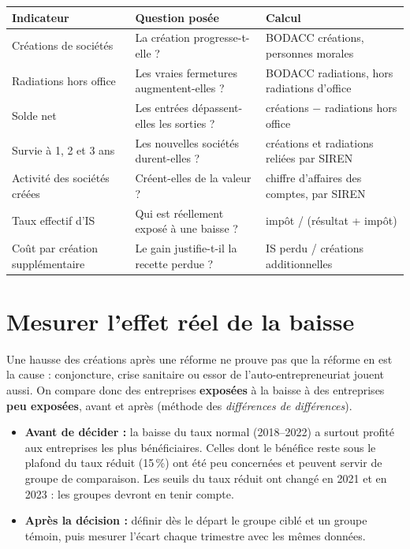 \documentclass[11pt,a4paper]{article}
\begin{document}
\begin{tabularx}{\textwidth}{@{}P{4.4cm}LP{5.4cm}@{}}
\toprule
\textbf{Indicateur} & \textbf{Question posée} & \textbf{Calcul} \\
\midrule
Créations de sociétés & La création progresse-t-elle ? & BODACC créations, personnes morales \\
Radiations hors office & Les vraies fermetures augmentent-elles ? & BODACC radiations, hors radiations d'office \\
Solde net & Les entrées dépassent-elles les sorties ? & créations $-$ radiations hors office \\
Survie à 1, 2 et 3 ans & Les nouvelles sociétés durent-elles ? & créations et radiations reliées par SIREN \\
Activité des sociétés créées & Créent-elles de la valeur ? & chiffre d'affaires des comptes, par SIREN \\
Taux effectif d'IS & Qui est réellement exposé à une baisse ? & impôt / (résultat + impôt) \\
Coût par création supplémentaire & Le gain justifie-t-il la recette perdue ? & IS perdu / créations additionnelles \\
\bottomrule
\end{tabularx}

\section{Mesurer l'effet réel de la baisse}

Une hausse des créations après une réforme ne prouve pas que la réforme en est la cause : conjoncture,
crise sanitaire ou essor de l'auto-entrepreneuriat jouent aussi. On compare donc des entreprises
\textbf{exposées} à la baisse à des entreprises \textbf{peu exposées}, avant et après
(méthode des \emph{différences de différences}).

\begin{itemize}
  \item \textbf{Avant de décider :} la baisse du taux normal (2018–2022) a surtout profité aux entreprises les plus
        bénéficiaires. Celles dont le bénéfice reste sous le plafond du taux réduit (15\,\%) ont été peu concernées
        et peuvent servir de groupe de comparaison. Les seuils du taux réduit ont changé en 2021 et en 2023 :
        les groupes devront en tenir compte.
  \item \textbf{Après la décision :} définir dès le départ le groupe ciblé et un groupe témoin,
        puis mesurer l'écart chaque trimestre avec les mêmes données.
\end{itemize}
\end{document}
